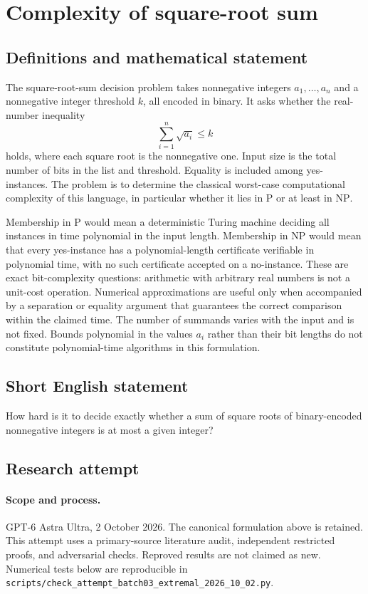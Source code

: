 \documentclass[11pt,a4paper]{article}
\begin{document}
\section*{Complexity of square-root sum}\label{statement}

\subsection{Definitions and mathematical statement}
The square-root-sum decision problem takes nonnegative integers
$a_1,\ldots,a_n$ and a nonnegative integer threshold $k$, all encoded
in binary. It asks whether the real-number inequality
\[
                            \sum_{i=1}^n\sqrt{a_i}\le k
\]
holds, where each square root is the nonnegative one. Input size is
the total number of bits in the list and threshold. Equality is
included among yes-instances. The problem is to determine the
classical worst-case computational complexity of this language,
in particular whether it lies in $\mathrm P$ or at least in
$\mathrm{NP}$.

Membership in $\mathrm P$ would mean a deterministic Turing machine
deciding all instances in time polynomial in the input length.
Membership in $\mathrm{NP}$ would mean that every yes-instance has
a polynomial-length certificate verifiable in polynomial time, with
no such certificate accepted on a no-instance.
These are exact bit-complexity questions: arithmetic with arbitrary
real numbers is not a unit-cost operation. Numerical approximations
are useful only when accompanied by a separation or equality argument
that guarantees the correct comparison within the claimed time.
The number of summands varies with the input and is not fixed.
Bounds polynomial in the values $a_i$ rather than their bit lengths
do not constitute polynomial-time algorithms in this formulation.
\subsection{Short English statement}
How hard is it to decide exactly whether a sum of square roots of binary-encoded nonnegative integers is at most a given integer?
\subsection{Research attempt}
\paragraph{Scope and process.}
GPT-6 Astra Ultra, 2 October 2026. The canonical formulation above is retained. This attempt uses a primary-source literature audit, independent restricted proofs, and adversarial checks. Reproved results are not claimed as new. Numerical tests below are reproducible in \texttt{scripts/check\_attempt\_batch03\_extremal\_2026\_10\_02.py}.
\end{document}
